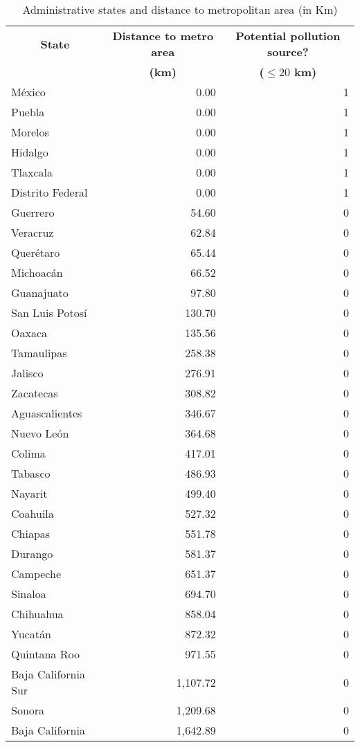 \begin{table}[htbp]
  \centering
  \caption{Administrative states and distance to metropolitan area (in Km)}
  \begin{tabular}{lrr}
    \midrule
    \midrule
    \multicolumn{1}{c}{\textbf{State}} &
    \multicolumn{1}{c}{\textbf{Distance to metro area}} &
    \multicolumn{1}{c}{\textbf{Potential pollution source?}} \\
    \multicolumn{1}{c}{} &
    \multicolumn{1}{c}{\textbf{(km)}} &
    \multicolumn{1}{c}{\textbf{($\leq 20$ km)}} \\
    \midrule
    México & 0.00 & 1 \\
    Puebla & 0.00 & 1 \\
    Morelos & 0.00 & 1 \\
    Hidalgo & 0.00 & 1 \\
    Tlaxcala & 0.00 & 1 \\
    Distrito Federal & 0.00 & 1 \\
    Guerrero & 54.60 & 0 \\
    Veracruz & 62.84 & 0 \\
    Querétaro & 65.44 & 0 \\
    Michoacán & 66.52 & 0 \\
    Guanajuato & 97.80 & 0 \\
    San Luis Potosí & 130.70 & 0 \\
    Oaxaca & 135.56 & 0 \\
    Tamaulipas & 258.38 & 0 \\
    Jalisco & 276.91 & 0 \\
    Zacatecas & 308.82 & 0 \\
    Aguascalientes & 346.67 & 0 \\
    Nuevo León & 364.68 & 0 \\
    Colima & 417.01 & 0 \\
    Tabasco & 486.93 & 0 \\
    Nayarit & 499.40 & 0 \\
    Coahuila & 527.32 & 0 \\
    Chiapas & 551.78 & 0 \\
    Durango & 581.37 & 0 \\
    Campeche & 651.37 & 0 \\
    Sinaloa & 694.70 & 0 \\
    Chihuahua & 858.04 & 0 \\
    Yucatán & 872.32 & 0 \\
    Quintana Roo & 971.55 & 0 \\
    Baja California Sur & 1,107.72 & 0 \\
    Sonora & 1,209.68 & 0 \\
    Baja California & 1,642.89 & 0 \\
    \bottomrule
    \bottomrule
  \end{tabular}
  \label{table_state_metro_distances}
\end{table}
